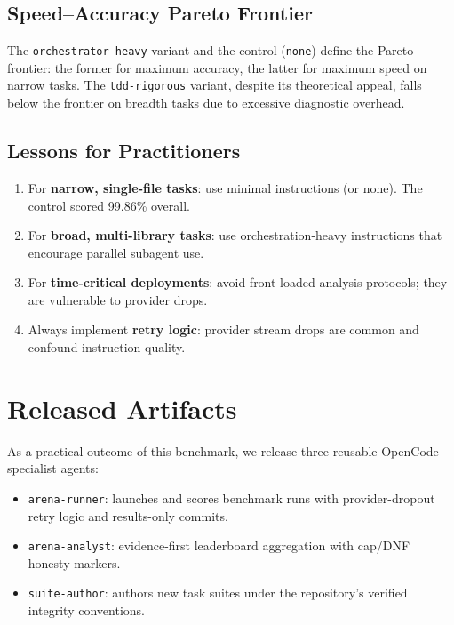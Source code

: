 \documentclass[journal]{IEEEtran}
\begin{document}
\subsection{Speed--Accuracy Pareto Frontier}
The \texttt{orchestrator-heavy} variant and the control (\texttt{none})
define the Pareto frontier: the former for maximum accuracy, the latter
for maximum speed on narrow tasks.
The \texttt{tdd-rigorous} variant, despite its theoretical appeal, falls
below the frontier on breadth tasks due to excessive diagnostic overhead.

\subsection{Lessons for Practitioners}
\begin{enumerate}
    \item For \textbf{narrow, single-file tasks}: use minimal instructions
          (or none). The control scored 99.86\% overall.
    \item For \textbf{broad, multi-library tasks}: use orchestration-heavy
          instructions that encourage parallel subagent use.
    \item For \textbf{time-critical deployments}: avoid front-loaded
          analysis protocols; they are vulnerable to provider drops.
    \item Always implement \textbf{retry logic}: provider stream drops are
          common and confound instruction quality.
\end{enumerate}

\section{Released Artifacts}
\label{sec:artifacts}

As a practical outcome of this benchmark, we release three reusable OpenCode
specialist agents:

\begin{itemize}
    \item \texttt{arena-runner}: launches and scores benchmark runs with
          provider-dropout retry logic and results-only commits.
    \item \texttt{arena-analyst}: evidence-first leaderboard aggregation
          with cap/DNF honesty markers.
    \item \texttt{suite-author}: authors new task suites under the
          repository's verified integrity conventions.
\end{itemize}
\end{document}
